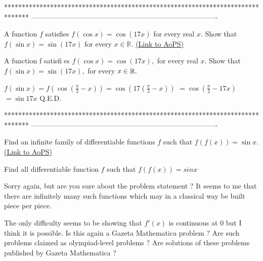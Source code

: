 *******************************************************************************
-------------------------------------------------------------------------------

\begin{problem}
	A function $f$ satisfies $f(\cos x) = \cos (17x)$ for every real $x$. Show that $f(\sin x) =\sin (17x)$ for every $x \in \mathbb{R}.$
	\flushright \href{https://artofproblemsolving.com/community/c6h445546}{(Link to AoPS)}
\end{problem}



\begin{solution}
	\begin{tcolorbox}A function f satisfies $f(\cos x) = \cos (17x),$ for every real $x.$ 
Show that $f(\sin x) =\sin (17x),$ for every $x \in \Bbb{R}.$\end{tcolorbox}
$f(\sin x)=f(\cos(\frac{\pi}2-x))=\cos(17(\frac{\pi}2-x))$ $=\cos(\frac{\pi}2-17x)$ $=\sin 17x$
Q.E.D.
\end{solution}
*******************************************************************************
-------------------------------------------------------------------------------

\begin{problem}
	Find an infinite family of differentiable functions $f$ such that $f(f(x))=\sin x$.
	\flushright \href{https://artofproblemsolving.com/community/c6h445845}{(Link to AoPS)}
\end{problem}



\begin{solution}
	\begin{tcolorbox}Find all differentiable function $f$ such that $f(f(x))=sinx$\end{tcolorbox}

Sorry again, but are you sure about the problem statement ?
It seems to me that there are infinitely many such functions which may in a classical way be built piece per piece.

The only difficulty seems to be showing that $f'(x)$ is continuous at $0$ but I think it is possible.
Is this again a Gazeta Mathematica problem ?
Are such problems claimed as olympiad-level problems ?
Are solutions of these problems published by Gazeta Mathematica ?
\end{solution}



